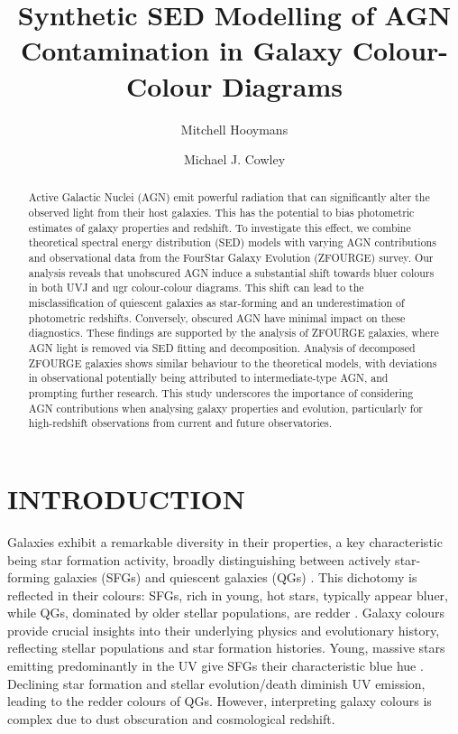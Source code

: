 \documentclass[
  journal=pasa,
  manuscript=research-paper,
  year=202X,
  volume=YY,
]{cup-journal}
\title{Synthetic SED Modelling of AGN Contamination in Galaxy Colour-Colour Diagrams}
\author{Mitchell Hooymans}
\affiliation{School of Mathematics and Physics, The University of Queensland, Brisbane, QLD 4072, Australia}
\author{Michael J. Cowley}
\affiliation{School of Chemistry and Physics, Queensland University of Technology, Brisbane, QLD 4000, Australia}
\begin{document}
\begin{abstract}
Active Galactic Nuclei (AGN) emit powerful radiation that can significantly alter the observed light from their host galaxies. This has the potential to bias photometric estimates of galaxy properties and redshift. To investigate this effect, we combine theoretical spectral energy distribution (SED) models with varying AGN contributions and observational data from the FourStar Galaxy Evolution (ZFOURGE) survey. Our analysis reveals that unobscured AGN induce a substantial shift towards bluer colours in both UVJ and ugr colour-colour diagrams. This shift can lead to the misclassification of quiescent galaxies as star-forming and an underestimation of photometric redshifts. Conversely, obscured AGN have minimal impact on these diagnostics. These findings are supported by the analysis of ZFOURGE galaxies, where AGN light is removed via SED fitting and decomposition. Analysis of decomposed ZFOURGE galaxies shows similar behaviour to the theoretical models, with deviations in observational potentially being attributed to intermediate-type AGN, and prompting further research. This study underscores the importance of considering AGN contributions when analysing galaxy properties and evolution, particularly for high-redshift observations from current and future observatories.
\end{abstract}

\section{INTRODUCTION}
\label{sec:introduction}

Galaxies exhibit a remarkable diversity in their properties, a key characteristic being star formation activity, broadly distinguishing between actively star-forming galaxies (SFGs) and quiescent galaxies (QGs) \citep{whitaker_newfirm_2011}. This dichotomy is reflected in their colours: SFGs, rich in young, hot stars, typically appear bluer, while QGs, dominated by older stellar populations, are redder \citep{baldry_quantifying_2004}. Galaxy colours provide crucial insights into their underlying physics and evolutionary history, reflecting stellar populations and star formation histories. Young, massive stars emitting predominantly in the UV give SFGs their characteristic blue hue \citep{madau_cosmic_2014}. Declining star formation and stellar evolution/death diminish UV emission, leading to the redder colours of QGs. However, interpreting galaxy colours is complex due to dust obscuration and cosmological redshift.
\end{document}
